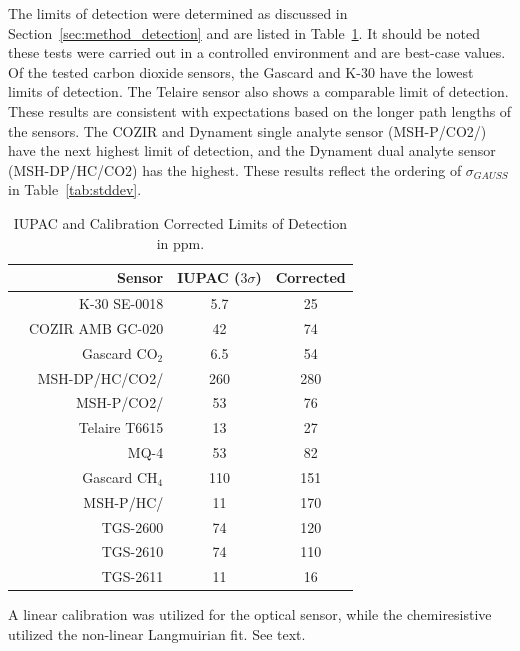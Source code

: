 \documentclass[times]{joehreview}
\begin{document}
	The limits of detection were determined as discussed in Section~\ref{sec:method_detection} and are listed in Table~\ref{tab:lod}.  It should be noted these tests were carried out in a controlled environment and are best-case values.  Of the tested carbon dioxide sensors, the Gascard and K-30 have the lowest limits of detection.  The Telaire sensor also shows a comparable limit of detection.  These results are consistent with expectations based on the longer path lengths of the sensors. The COZIR and Dynament single analyte sensor (MSH-P/CO2/) have the next highest limit of detection, and the Dynament dual analyte sensor (MSH-DP/HC/CO2) has the highest.  These results reflect the ordering of $\sigma_{GAUSS}$ in Table~\ref{tab:stddev}.
	
	\begin{table}[!t]
		\begin{center}
			\begin{threeparttable}
				\setlength{\tabcolsep}{1em}
				\renewcommand{\arraystretch}{1.3}
				\caption{IUPAC and Calibration Corrected Limits of Detection in ppm. }
				\label{tab:lod}
				\begin{tabular}{ c | r | c | c}
					& Sensor               & IUPAC ($3\sigma$)      & Corrected\tnote{\dag} \\ \hline
					\multirow{6}{*}{\rotatebox[origin=c]{90}{Carbon Dioxide}}
					& K-30 SE-0018         & 5.7        & 25    \\
					& COZIR AMB GC-020     & 42         & 74    \\
					& Gascard CO$_2$       & 6.5        & 54    \\
					& MSH-DP/HC/CO2/       & 260        & 280   \\
					& MSH-P/CO2/           & 53         & 76    \\
					& Telaire T6615        & 13         & 27    \\ \hline
					\multirow{7}{*}{\rotatebox[origin=c]{90}{Methane}}
					& MQ-4     & 53        & 82  \\
					& Gascard CH$_4$       & 110  & 151  \\
					& MSH-P/HC/            & 11 & 170  \\
					& TGS-2600& 74   & 120  \\
					& TGS-2610  & 74    & 110  \\
					& TGS-2611 & 11     & 16  
				\end{tabular}
				\begin{tablenotes}
					\item[\dag] A linear calibration was utilized for the optical sensor, while the chemiresistive utilized the non-linear Langmuirian fit. See text.
					\vspace{1eX}
				\end{tablenotes}
			\end{threeparttable}
		\end{center}
	\end{table}
	
\end{document}
